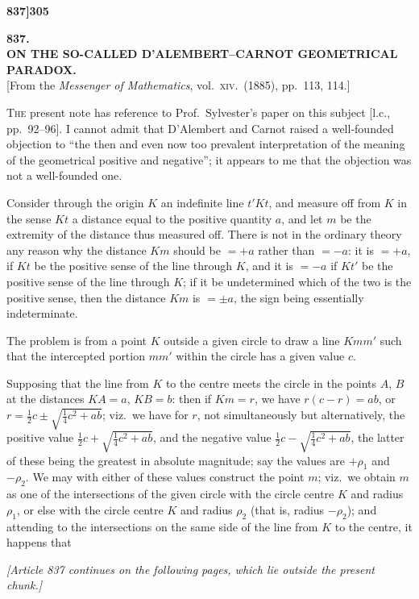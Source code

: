 \documentclass[11pt]{article}
\begin{document}

\newpage

\noindent\textbf{837]}\hfill\hfill\textbf{305}

\bigskip

\begin{center}
{\large\textbf{837.}}\\[0.7em]
{\large\textbf{ON THE SO-CALLED D'ALEMBERT--CARNOT GEOMETRICAL\\ PARADOX.}}\\[1em]
{\small [From the \textit{Messenger of Mathematics}, vol.\ \textsc{xiv}.\ (1885), pp.\ 113, 114.]}
\end{center}

\bigskip

\noindent \textsc{The} present note has reference to Prof.\ Sylvester's paper on this subject [l.c., pp.\ 92--96]. I cannot admit that D'Alembert and Carnot raised a well-founded objection to ``the then and even now too prevalent interpretation of the meaning of the geometrical positive and negative''; it appears to me that the objection was not a well-founded one.

\medskip

Consider through the origin $K$ an indefinite line $t'Kt$, and measure off from $K$ in the sense $Kt$ a distance equal to the positive quantity $a$, and let $m$ be the extremity of the distance thus measured off. There is not in the ordinary theory any reason why the distance $Km$ should be $= +a$ rather than $= -a$: it is $= +a$, if $Kt$ be the positive sense of the line through $K$, and it is $= -a$ if $Kt'$ be the positive sense of the line through $K$; if it be undetermined which of the two is the positive sense, then the distance $Km$ is $= \pm a$, the sign being essentially indeterminate.

\medskip

The problem is from a point $K$ outside a given circle to draw a line $Kmm'$ such that the intercepted portion $mm'$ within the circle has a given value $c$.

\medskip

Supposing that the line from $K$ to the centre meets the circle in the points $A$, $B$ at the distances $KA = a$, $KB = b$: then if $Km = r$, we have $r(c - r) = ab$, or $r = \tfrac{1}{2}c \pm \sqrt{\tfrac{1}{4}c^{2} + ab}$; viz.\ we have for $r$, not simultaneously but alternatively, the positive value $\tfrac{1}{2}c + \sqrt{\tfrac{1}{4}c^{2} + ab}$, and the negative value $\tfrac{1}{2}c - \sqrt{\tfrac{1}{4}c^{2} + ab}$, the latter of these being the greatest in absolute magnitude; say the values are $+\rho_{1}$ and $-\rho_{2}$. We may with either of these values construct the point $m$; viz.\ we obtain $m$ as one of the intersections of the given circle with the circle centre $K$ and radius $\rho_{1}$, or else with the circle centre $K$ and radius $\rho_{2}$ (that is, radius $-\rho_{2}$); and attending to the intersections on the same side of the line from $K$ to the centre, it happens that

\medskip

\noindent\textit{[Article 837 continues on the following pages, which lie outside the present chunk.]}
\end{document}
